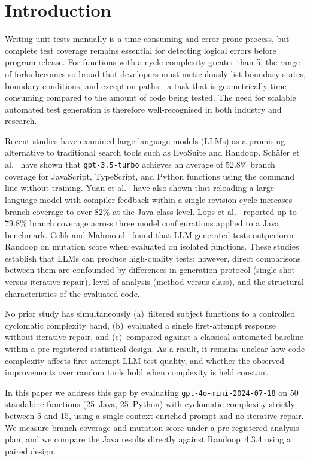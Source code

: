 \section{Introduction}
\label{sec:introduction}

Writing unit tests manually is a time-consuming and error-prone process, but complete test coverage remains essential for detecting logical errors before program release. For functions with a cycle complexity greater than 5, the range of forks becomes so broad that developers must meticulously list boundary states, boundary conditions, and exception paths---a task that is geometrically time-consuming compared to the amount of code being tested. The need for scalable automated test generation is therefore well-recognised in both industry and research.

Recent studies have examined large language models (LLMs) as a promising alternative to traditional search tools such as EvoSuite and Randoop. Sch{\"a}fer et al.~\cite{schafer2024testpilot} have shown that \texttt{gpt-3.5-turbo} achieves an average of 52.8\% branch coverage for JavaScript, TypeScript, and Python functions using the command line without training. Yuan et al.~\cite{yuan2024chattester} have also shown that reloading a large language model with compiler feedback within a single revision cycle increases branch coverage to over 82\% at the Java class level. Lops et al.~\cite{lops2025agonetest} reported up to 79.8\% branch coverage across three model configurations applied to a Java benchmark. Celik and Mahmoud~\cite{celik2026gem} found that LLM-generated tests outperform Randoop on mutation score when evaluated on isolated functions. These studies establish that LLMs can produce high-quality tests; however, direct comparisons between them are confounded by differences in generation protocol (single-shot versus iterative repair), level of analysis (method versus class), and the structural characteristics of the evaluated code.

No prior study has simultaneously (a)~filtered subject functions to a controlled cyclomatic complexity band, (b)~evaluated a single first-attempt response without iterative repair, and (c)~compared against a classical automated baseline within a pre-registered statistical design. As a result, it remains unclear how code complexity affects first-attempt LLM test quality, and whether the observed improvements over random tools hold when complexity is held constant.

In this paper we address this gap by evaluating \texttt{gpt-4o-mini-2024-07-18} on 50 standalone functions (25~Java, 25~Python) with cyclomatic complexity strictly between 5 and 15, using a single context-enriched prompt and no iterative repair. We measure branch coverage and mutation score under a pre-registered analysis plan, and we compare the Java results directly against Randoop~4.3.4 using a paired design.

